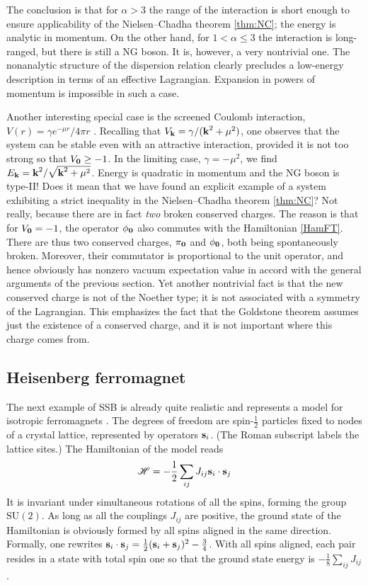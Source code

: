 \documentclass[final,3p,times,12pt,a4paper,sort&compress]{elsarticle}
\newcommand\gr[1]{\mathrm{#1}}              %
\newcommand\Ham{\mathscr{H}}                %
\newcommand\vek[1]{{\boldsymbol{\bf #1}}}   %
\begin{document}
The conclusion is that for $\alpha>3$ the range of the interaction is short
enough to ensure applicability of the Nielsen--Chadha theorem \ref{thm:NC}; the
energy is analytic in momentum. On the other hand, for $1<\alpha\leq3$ the
interaction is long-ranged, but there is still a NG boson. It is, however, a
very nontrivial one. The nonanalytic structure of the dispersion relation
clearly precludes a low-energy description in terms of an effective Lagrangian.
Expansion in powers of momentum is impossible in such a case.

Another interesting special case is the screened Coulomb interaction,
$V(r)=\gamma e^{-\mu r}/4\pi r$ \cite{Guralnik:1968gu}. Recalling that $V_{\vek
k}=\gamma/(\vek k^2+\mu^2)$, one observes that the system can be stable even
with an attractive interaction, provided it is not too strong so that
$V_{\vek0}\geq-1$. In the limiting case, $\gamma=-\mu^2$, we find $E_{\vek
k}=\vek k^2/\sqrt{\vek k^2+\mu^2}$. Energy is quadratic in momentum and the NG
boson is type-II! Does it mean that we have found an explicit example of a
system exhibiting a strict inequality in the Nielsen--Chadha theorem
\ref{thm:NC}? Not really, because there are in fact \emph{two} broken conserved
charges. The reason is that for $V_{\vek0}=-1$, the operator $\phi_{\vek0}$
also commutes with the Hamiltonian \eqref{HamFT}. There are thus two conserved
charges, $\pi_{\vek0}$ and $\phi_{\vek0}$, both being spontaneously broken.
Moreover, their commutator is proportional to the unit operator, and hence
obviously has nonzero vacuum expectation value in accord with the general
arguments of the previous section. Yet another nontrivial fact is that the new
conserved charge is not of the Noether type; it is not associated with a
symmetry of the Lagrangian. This emphasizes the fact that the Goldstone theorem
assumes just the existence of a conserved charge, and it is not important where
this charge comes from.


\subsection{Heisenberg ferromagnet}
\label{subsec:heisenberg}
The next example of SSB is already quite realistic and represents a model for
isotropic ferromagnets \cite{Lange:1966zz}. The degrees of freedom are
spin-$\frac12$ particles fixed to nodes of a crystal lattice, represented by
operators $\vek s_i$. (The Roman subscript labels the lattice sites.) The
Hamiltonian of the model reads
\begin{equation}
\Ham=-\frac12\sum_{ij}J_{ij}\vek s_i\cdot\vek s_j
\label{Heisenberg}
\end{equation}
It is invariant under simultaneous rotations of all the spins, forming the
group $\gr{SU(2)}$. As long as all the couplings $J_{ij}$ are positive, the
ground state of the Hamiltonian is obviously formed by all spins aligned in the
same direction. Formally, one rewrites $\vek s_i\cdot\vek s_j=\frac12(\vek
s_i+\vek s_j)^2-\frac34$. With all spins aligned, each pair resides in a state
with total spin one so that the ground state energy is
$-\frac18\sum_{ij}J_{ij}$.
\end{document}
